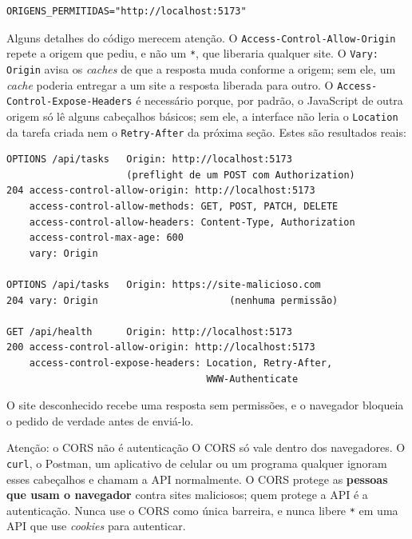 \begin{codigo}
\begin{Verbatim}[breaklines=true, breaksymbolleft={}, fontsize=\footnotesize]
ORIGENS_PERMITIDAS="http://localhost:5173"
\end{Verbatim}
\end{codigo}

Alguns detalhes do código merecem atenção. O \texttt{Access-Control-Allow-Origin} repete a origem que pediu, e não um \texttt{*}, que liberaria qualquer site. O \texttt{Vary: Origin} avisa os \textit{caches} de que a resposta muda conforme a origem; sem ele, um \textit{cache} poderia entregar a um site a resposta liberada para outro. O \texttt{Access-Control-Expose-Headers} é necessário porque, por padrão, o JavaScript de outra origem só lê alguns cabeçalhos básicos; sem ele, a interface não leria o \texttt{Location} da tarefa criada nem o \texttt{Retry-After} da próxima seção. Estes são resultados reais:

\begin{codigo}
\begin{Verbatim}[breaklines=true, breaksymbolleft={}, fontsize=\footnotesize]
OPTIONS /api/tasks   Origin: http://localhost:5173
                     (preflight de um POST com Authorization)
204 access-control-allow-origin: http://localhost:5173
    access-control-allow-methods: GET, POST, PATCH, DELETE
    access-control-allow-headers: Content-Type, Authorization
    access-control-max-age: 600
    vary: Origin

OPTIONS /api/tasks   Origin: https://site-malicioso.com
204 vary: Origin                       (nenhuma permissão)

GET /api/health      Origin: http://localhost:5173
200 access-control-allow-origin: http://localhost:5173
    access-control-expose-headers: Location, Retry-After,
                                   WWW-Authenticate
\end{Verbatim}
\end{codigo}

O site desconhecido recebe uma resposta sem permissões, e o navegador bloqueia o pedido de verdade antes de enviá-lo.

\begin{destaque}{Atenção: o CORS não é autenticação}
O CORS só vale dentro dos navegadores. O \texttt{curl}, o Postman, um aplicativo de celular ou um programa qualquer ignoram esses cabeçalhos e chamam a API normalmente. O CORS protege as \textbf{pessoas que usam o navegador} contra sites maliciosos; quem protege a API é a autenticação. Nunca use o CORS como única barreira, e nunca libere \texttt{*} em uma API que use \textit{cookies} para autenticar.
\end{destaque}


